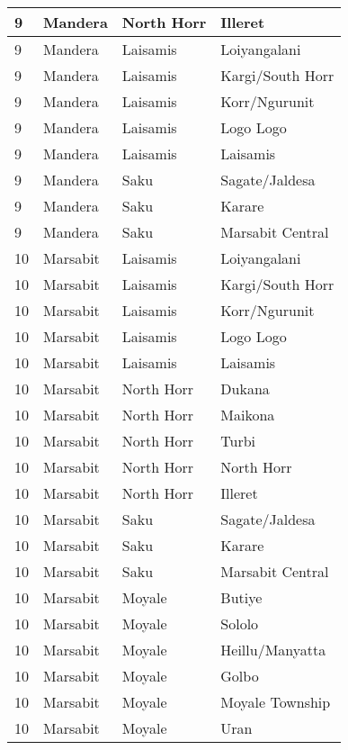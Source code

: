 \begin{table}[!ht]
\begin{tabular}{|l|l|l|l|}
        9 & Mandera & North Horr & Illeret \\ \hline
        9 & Mandera & Laisamis & Loiyangalani \\ \hline
        9 & Mandera & Laisamis & Kargi/South Horr \\ \hline
        9 & Mandera & Laisamis & Korr/Ngurunit \\ \hline
        9 & Mandera & Laisamis & Logo Logo \\ \hline
        9 & Mandera & Laisamis & Laisamis \\ \hline
        9 & Mandera & Saku & Sagate/Jaldesa \\ \hline
        9 & Mandera & Saku & Karare \\ \hline
        9 & Mandera & Saku & Marsabit Central \\ \hline
        10 & Marsabit & Laisamis &   Loiyangalani \\ \hline
        10 & Marsabit & Laisamis & Kargi/South Horr \\ \hline
        10 & Marsabit & Laisamis & Korr/Ngurunit \\ \hline
        10 & Marsabit & Laisamis & Logo Logo \\ \hline
        10 & Marsabit & Laisamis & Laisamis \\ \hline
        10 & Marsabit & North Horr &   Dukana \\ \hline
        10 & Marsabit & North Horr & Maikona \\ \hline
        10 & Marsabit & North Horr & Turbi \\ \hline
        10 & Marsabit & North Horr & North Horr \\ \hline
        10 & Marsabit & North Horr &  Illeret \\ \hline
        10 & Marsabit & Saku & Sagate/Jaldesa \\ \hline
        10 & Marsabit & Saku & Karare \\ \hline
        10 & Marsabit & Saku & Marsabit Central \\ \hline
        10 & Marsabit & Moyale & Butiye \\ \hline
        10 & Marsabit & Moyale & Sololo \\ \hline
        10 & Marsabit & Moyale & Heillu/Manyatta \\ \hline
        10 & Marsabit & Moyale & Golbo \\ \hline
        10 & Marsabit & Moyale & Moyale Township \\ \hline
        10 & Marsabit & Moyale & Uran \\ \hline

\end{tabular}
\end{table}
